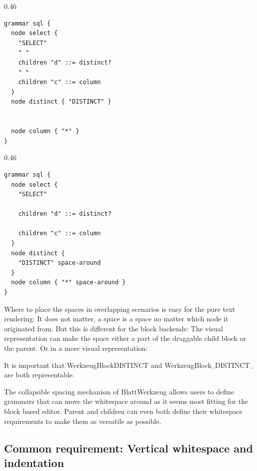 \documentclass[]{report}
\begin{document}
\begin{listing}[H]
\centering
\begin{sublisting}[t]{0.46\linewidth}
\begin{verbatim}
grammar sql {
  node select {
    "SELECT"
    " "
    children "d" ::= distinct?
    " "
    children "c" ::= column
  }
  node distinct { "DISTINCT" }


  node column { "*" }
}
\end{verbatim}
  \caption{node \texttt{select} tries to ensure proper spacing, renders \texttt{SELECT␣␣*} without a \texttt{DISTINCT} node}
\end{sublisting}%
\hfill
\begin{sublisting}[t]{0.46\linewidth}
\begin{verbatim}
grammar sql {
  node select {
    "SELECT"

    children "d" ::= distinct?

    children "c" ::= column
  }
  node distinct {
    "DISTINCT" space-around
  }
  node column { "*" space-around }
}
\end{verbatim}
  \caption{Spacing part of all child nodes}
\end{sublisting}%
  \label{lst:grammar-explicit-whitespace-sql-select}
\end{listing}

Where to place the spaces in overlapping scenarios is easy for the pure text rendering: It does not matter, a space is a space no matter which node it originated from. But this is different for the block backends: The visual representation can make the space either a part of the draggable child block or the parent. Or in a more visual representation:

\begin{center}
  It is important that \Blatt\-WerkzeugBlock{DISTINCT} and \Blatt\-WerkzeugBlock{␣DISTINCT␣} are both representable.
\end{center}

The collapsible spacing mechanism of Blatt\-Werkzeug allows users to define grammars that can move the whitespace around as it seems most fitting for the block based editor. Parent and children can even both define their whitespace requirements to make them as versatile as possible.

\subsection{Common requirement: Vertical whitespace and indentation}
\end{document}
